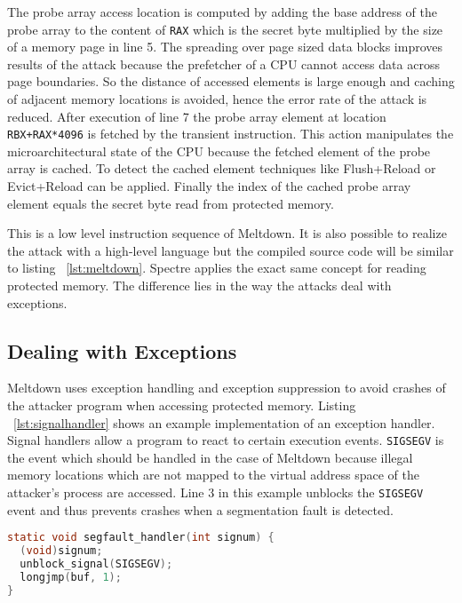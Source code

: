 \documentclass[a4paper,oneside,openright] {scrreprt}
\begin{document}
The probe array access location is computed by adding the base address of the probe array to the content of \texttt{RAX} which 
is the secret byte multiplied by the size of a memory page in line 5.
The spreading over page sized data blocks improves results of the attack because the prefetcher of a CPU
 cannot access data across page boundaries.
So the distance of accessed elements is large enough and caching of adjacent memory locations is avoided, hence the 
error rate of the attack is reduced. 
After execution of line 7 the probe array element at location \texttt{RBX+RAX*4096} is fetched by the transient instruction.
This action manipulates the microarchitectural state of the CPU because the fetched element of the probe array is cached.
To detect the cached element techniques like Flush+Reload or Evict+Reload can be applied.
Finally the index of the cached probe array element equals the secret byte read from protected memory.

This is a low level instruction sequence of Meltdown. It is also possible to realize the attack with a high-level language
but the compiled source code will be similar to listing ~\ref{lst:meltdown}.
Spectre applies the exact same concept for reading protected memory. 
The difference lies in the way the attacks deal with exceptions.



\subsection{Dealing with Exceptions}
\label{ch:intro:motivation:A}

Meltdown uses exception handling and exception suppression to avoid crashes of the attacker program when accessing protected memory.
Listing ~\ref{lst:signalhandler} shows an example implementation of an exception handler.
Signal handlers allow a program to react to certain execution events. 
\texttt{SIGSEGV} is the event which should be handled in the case of Meltdown because illegal memory locations 
which are not mapped to the virtual address space of the attacker's process are accessed.
Line 3 in this example unblocks the \texttt{SIGSEGV} event and thus prevents crashes when a segmentation fault is detected.

\begin{lstlisting}[language=C, caption=Meltdown: Exception Handling 1, label={lst:signalhandler}]
static void segfault_handler(int signum) {
  (void)signum;
  unblock_signal(SIGSEGV);
  longjmp(buf, 1);
}
\end{lstlisting}
\end{document}
